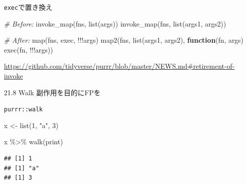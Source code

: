 \documentclass[
  ignorenonframetext,
  aspectratio=169]{beamer}
\newenvironment{Shaded}{\begin{snugshade}}{\end{snugshade}}
\newcommand{\CommentTok}[1]{\textcolor[rgb]{0.56,0.35,0.01}{\textit{#1}}}
\newcommand{\ControlFlowTok}[1]{\textcolor[rgb]{0.13,0.29,0.53}{\textbf{#1}}}
\newcommand{\DecValTok}[1]{\textcolor[rgb]{0.00,0.00,0.81}{#1}}
\newcommand{\FunctionTok}[1]{\textcolor[rgb]{0.00,0.00,0.00}{#1}}
\newcommand{\NormalTok}[1]{#1}
\newcommand{\OtherTok}[1]{\textcolor[rgb]{0.56,0.35,0.01}{#1}}
\newcommand{\SpecialCharTok}[1]{\textcolor[rgb]{0.00,0.00,0.00}{#1}}
\newcommand{\StringTok}[1]{\textcolor[rgb]{0.31,0.60,0.02}{#1}}
\begin{document}
\begin{frame}[fragile]{\texttt{exec}で置き換え}
\protect\hypertarget{execux3067ux7f6eux304dux63dbux3048}{}
\begin{Shaded}
\begin{Highlighting}[]
\CommentTok{\# Before:}
\FunctionTok{invoke\_map}\NormalTok{(fns, }\FunctionTok{list}\NormalTok{(args))}
\FunctionTok{invoke\_map}\NormalTok{(fns, }\FunctionTok{list}\NormalTok{(args1, args2))}

\CommentTok{\# After:}
\FunctionTok{map}\NormalTok{(fns, exec, }\SpecialCharTok{!!!}\NormalTok{args)}
\FunctionTok{map2}\NormalTok{(fns, }\FunctionTok{list}\NormalTok{(args1, args2), }\ControlFlowTok{function}\NormalTok{(fn, args) }\FunctionTok{exec}\NormalTok{(fn, }\SpecialCharTok{!!!}\NormalTok{args))}
\end{Highlighting}
\end{Shaded}

\url{https://github.com/tidyverse/purrr/blob/master/NEWS.md\#retirement-of-invoke}
\end{frame}

\begin{frame}{21.8 Walk}
\protect\hypertarget{walk}{}
副作用を目的にFPを
\end{frame}

\begin{frame}[fragile]{\texttt{purrr::walk}}
\protect\hypertarget{purrrwalk}{}
\begin{Shaded}
\begin{Highlighting}[]
\NormalTok{x }\OtherTok{\textless{}{-}} \FunctionTok{list}\NormalTok{(}\DecValTok{1}\NormalTok{, }\StringTok{"a"}\NormalTok{, }\DecValTok{3}\NormalTok{) }

\NormalTok{x }\SpecialCharTok{\%\textgreater{}\%} \FunctionTok{walk}\NormalTok{(print)}
\end{Highlighting}
\end{Shaded}

\begin{verbatim}
## [1] 1
## [1] "a"
## [1] 3
\end{verbatim}
\end{frame}
\end{document}
